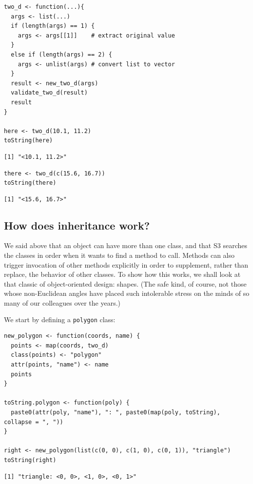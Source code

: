 \begin{lstlisting}
two_d <- function(...){
  args <- list(...)
  if (length(args) == 1) {
    args <- args[[1]]    # extract original value
  }
  else if (length(args) == 2) {
    args <- unlist(args) # convert list to vector
  }
  result <- new_two_d(args)
  validate_two_d(result)
  result
}

here <- two_d(10.1, 11.2)
toString(here)
\end{lstlisting}

\begin{lstlisting}
[1] "<10.1, 11.2>"
\end{lstlisting}

\begin{lstlisting}
there <- two_d(c(15.6, 16.7))
toString(there)
\end{lstlisting}

\begin{lstlisting}
[1] "<15.6, 16.7>"
\end{lstlisting}

\subsection*{How does inheritance work?}

We said above that an object can have more than one class,
and that S3 searches the classes in order when it wants to find a method to call.
Methods can also trigger invocation of other methods explicitly in order to supplement,
rather than replace,
the behavior of other classes.
To show how this works,
we shall look at that classic of object-oriented design: shapes.
(The safe kind,
of course,
not those whose non-Euclidean angles have placed such intolerable stress
on the minds of so many of our colleagues over the years.)

We start by defining a \texttt{polygon} class:

\begin{lstlisting}
new_polygon <- function(coords, name) {
  points <- map(coords, two_d)
  class(points) <- "polygon"
  attr(points, "name") <- name
  points
}

toString.polygon <- function(poly) {
  paste0(attr(poly, "name"), ": ", paste0(map(poly, toString), collapse = ", "))
}

right <- new_polygon(list(c(0, 0), c(1, 0), c(0, 1)), "triangle")
toString(right)
\end{lstlisting}

\begin{lstlisting}
[1] "triangle: <0, 0>, <1, 0>, <0, 1>"
\end{lstlisting}

